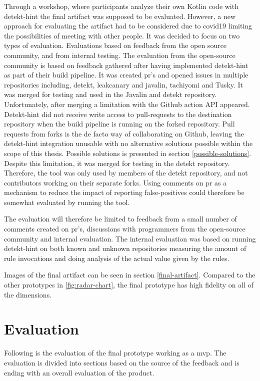 \documentclass{report}
\begin{document}
Through a workshop, where participants analyze their own Kotlin code with detekt-hint the final artifact was supposed to be evaluated. However, a new approach for evaluating the artifact had to be considered due to \gls{covid19} limiting the possibilities of meeting with other people. It was decided to focus on two types of evaluation. Evaluations based on feedback from the open source community, and from internal testing. The evaluation from the open-source community is based on feedback gathered after having implemented detekt-hint as part of their build pipeline. It was created \gls{pr}'s and opened issues in multiple repositories including, detekt\cite{detekt}, leakcanary\cite{leakcanary}  and javalin\cite{javalin}, tachiyomi\cite{tachiyomi} and Tusky\cite{tusky}. It was merged for testing and used in the Javalin and detekt repository. Unfortunately, after merging a limitation with the Github action API appeared. Detekt-hint did not receive write access to pull-requests to the destination repository when the build pipeline is running on the forked repository. Pull requests from forks is the de facto way of collaborating on Github, leaving the detekt-hint integration unusable with no alternative solutions possible within the scope of this thesis. Possible solutions is presented in 
section \ref{possible-solutions}. Despite this limitation, it was merged for testing in the detekt repository. Therefore, the tool was only used by members of the detekt repository, and not contributors working on their separate forks. Using comments on \gls{pr} as a mechanism to reduce the impact of reporting false-positives could therefore be somewhat evaluated by running the tool.

The evaluation will therefore be limited to feedback from a small number of comments created on \gls{pr}'s, discussions with programmers from the open-source community and internal evaluation. The internal evaluation was based on running detekt-hint on both known and unknown repositories measuring the amount of rule invocations and doing analysis of the actual value given by the rules. 

Images of the final artifact can be seen in section \ref{final-artifact}. Compared to the other prototypes in \ref{fig:radar-chart}, the final prototype has high fidelity on all of the dimensions. 


\section{Evaluation}
Following is the evaluation of the final prototype working as a \gls{mvp}. The evaluation is divided into sections based on the source of the feedback and is ending with an overall evaluation of the product.
\end{document}
